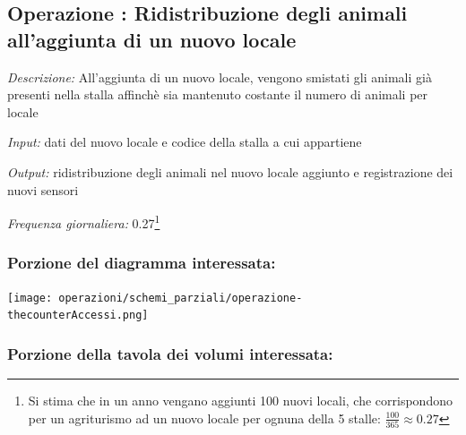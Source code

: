 \documentclass[12pt,a4paper]{article}
\begin{document}
\subsection*{Operazione \thecounterAccessi{}: Ridistribuzione degli animali all'aggiunta di un nuovo locale}
\noindent\textit{Descrizione:} All'aggiunta di un nuovo locale, vengono smistati gli animali già presenti nella stalla affinchè sia mantenuto costante il numero di animali per locale

\noindent\textit{Input:} dati del nuovo locale e codice della stalla a cui appartiene

\noindent\textit{Output:} ridistribuzione degli animali nel nuovo locale aggiunto e registrazione dei nuovi sensori

\noindent\textit{Frequenza giornaliera:} 0.27\footnote{Si stima che in un anno vengano aggiunti 100 nuovi locali, che corrispondono per un agriturismo ad un nuovo locale per ognuna della 5 stalle: $\frac{100}{365}\approx 0.27$}

\subsubsection*{Porzione del diagramma interessata:}



\texttt{[image: operazioni/schemi\_parziali/operazione-\\thecounterAccessi.png]} 


\pagebreak
\subsubsection*{Porzione della tavola dei volumi interessata:}
\end{document}
